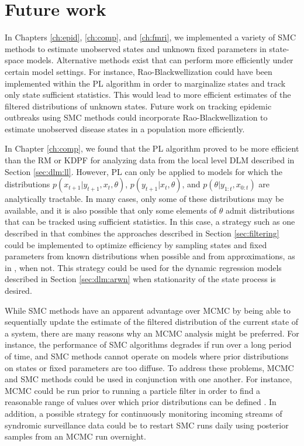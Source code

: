 \chapter{Future work \label{ch:future}}

In Chapters \ref{ch:epid}, \ref{ch:comp}, and \ref{ch:fmri}, we implemented a variety of SMC methods to estimate unobserved states and unknown fixed parameters in state-space models. Alternative methods exist that can perform more efficiently under certain model settings. For instance, Rao-Blackwellization \citep{Douc:Gods:Andr:on:2000} could have been implemented within the PL algorithm in order to marginalize states and track only state sufficient statistics. This would lead to more efficient estimates of the filtered distributions of unknown states. Future work on tracking epidemic outbreaks using SMC methods could incorporate Rao-Blackwellization to estimate unobserved disease states in a population more efficiently.

In Chapter \ref{ch:comp}, we found that the PL algorithm proved to be more efficient than the RM or KDPF for analyzing data from the local level DLM described in Section \ref{sec:dlm:ll}. However, PL can only be applied to models for which the distributions $p(x_{t+1}|y_{t+1},x_t,\theta)$, $p(y_{t+1}|x_t,\theta)$, and $p(\theta|y_{1:t},x_{0:t})$ are analytically tractable. In many cases, only some of these distributions may be available, and it is also possible that only some elements of $\theta$ admit distributions that can be tracked using sufficient statistics. In this case, a strategy such as one described in \citet{dukic2012tracking} that combines the approaches described in Section \ref{sec:filtering} could be implemented to optimize efficiency by sampling states and fixed parameters from known distributions when possible and from approximations, as in \citet{Liu:West:comb:2001}, when not. This strategy could be used for the dynamic regression models described in Section \ref{sec:dlm:arwn} when stationarity of the state process is desired.

While SMC methods have an apparent advantage over MCMC by being able to sequentially update the estimate of the filtered distribution of the current state of a system, there are many reasons why an MCMC analysis might be preferred. For instance, the performance of SMC algorithms degrades if run over a long period of time, and SMC methods cannot operate on models where prior distributions on states or fixed parameters are too diffuse. To address these problems, MCMC and SMC methods could be used in conjunction with one another. For instance, MCMC could be run prior to running a particle filter in order to find a reasonable range of values over which prior distributions can be defined \cite[Chapter 5][]{petris:camp:2009:dynamic}. In addition, a possible strategy for continuously monitoring incoming streams of syndromic surveillance data could be to restart SMC runs daily using posterior samples from an MCMC run overnight.

